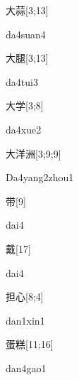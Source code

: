 \begin{verbete}[da4suan4]{大蒜}[3;13]
\begin{pronuncia}{da4suan4}
\end{pronuncia}
\end{verbete}

\begin{verbete}[da4tui3]{大腿}[3;13]
\begin{pronuncia}{da4tui3}
\end{pronuncia}
\end{verbete}

\begin{verbete}[da4xue2]{大学}[3;8]
\begin{pronuncia}{da4xue2}
\end{pronuncia}
\end{verbete}

\begin{verbete}{大洋洲}[3;9;9]
\begin{pronuncia}{Da4yang2zhou1}
\end{pronuncia}
\end{verbete}

\begin{verbete}[dai4]{带}[9]
\begin{pronuncia}{dai4}
\end{pronuncia}
\end{verbete}

\begin{verbete}[dai4]{戴}[17]
\begin{pronuncia}{dai4}
\end{pronuncia}
\end{verbete}

\begin{verbete}{担心}[8;4]
\begin{pronuncia}{dan1xin1}
\end{pronuncia}
\end{verbete}

\begin{verbete}{蛋糕}[11;16]
\begin{pronuncia}{dan4gao1}
\end{pronuncia}
\end{verbete}

